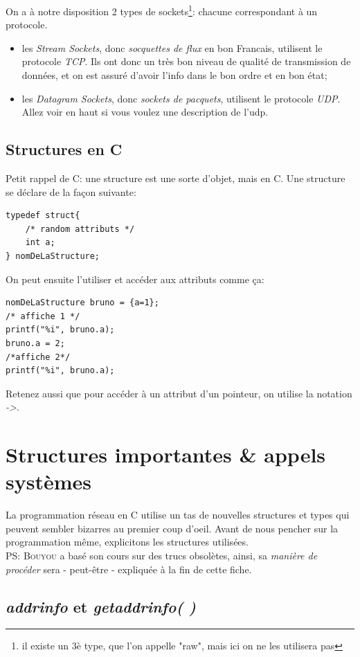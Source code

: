 \documentclass{report}
\begin{document}
On a à notre disposition 2 types de sockets\footnote{il existe un 3è type, que l'on appelle "raw", mais ici on ne les utilisera pas}: chacune correspondant à un protocole.
\begin{itemize}
\item{les \emph{Stream Sockets}, donc \emph{socquettes de flux} en bon Francais, utilisent le protocole \emph{TCP}. Ils ont donc un très bon niveau de qualité de transmission de données, et on est assuré d'avoir l'info dans le bon ordre et en bon état;}
\item{les \emph{Datagram Sockets}, donc \emph{sockets de pacquets}, utilisent le protocole \emph{UDP}. Allez voir en haut si vous voulez une description de l'udp.}
\end{itemize}

\subsection{Structures en C}
Petit rappel de C: une structure est une sorte d'objet, mais en C. Une structure se déclare de la façon suivante:
\begin{lstlisting}
typedef struct{
	/* random attributs */
	int a;
} nomDeLaStructure;
\end{lstlisting}
On peut ensuite l'utiliser et accéder aux attributs comme ça:
\begin{lstlisting}
nomDeLaStructure bruno = {a=1};
/* affiche 1 */
printf("%i", bruno.a);
bruno.a = 2;
/*affiche 2*/
printf("%i", bruno.a);
\end{lstlisting}
Retenez aussi que pour accéder à un attribut d'un pointeur, on utilise la notation \emph{->}.

\section{Structures importantes \& appels systèmes} 
La programmation réseau en C utilise un tas de nouvelles structures et types qui peuvent sembler bizarres au premier coup d'oeil. Avant de nous pencher sur la programmation même, explicitons les structures utilisées.\\
PS: \textsc{Bouyou} a basé son cours sur des trucs obsolètes, ainsi, sa \emph{manière de procéder} sera - peut-être - expliquée à la fin de cette fiche.

\subsection{\emph{addrinfo} et \emph{getaddrinfo( )}}
\end{document}
